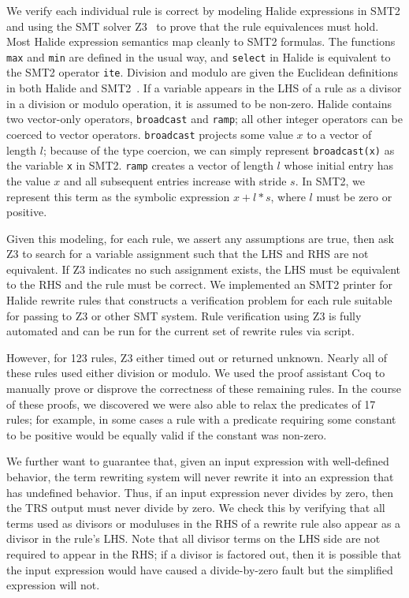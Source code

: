 \documentclass[sigplan,10pt,review,anonymous]{acmart}\settopmatter{printfolios=true,printccs=false,printacmref=false}
\newcommand{\NumPredicatesRelaxed}{{\color{black} 17}\xspace}
\begin{document}
We verify each individual rule is correct by modeling Halide expressions in SMT2
and using the SMT solver Z3~\cite{de2008z3} to prove that the rule equivalences must hold.
Most Halide expression semantics map cleanly
to SMT2 formulas. The functions \texttt{max} and \texttt{min} are defined in
the usual way, and \texttt{select} in Halide is equivalent to the SMT2 operator
\texttt{ite}. Division and modulo are given the Euclidean definitions in both
Halide and SMT2~\cite{boute1992euclidean}. If a variable appears in the LHS of a rule as a divisor in a
division or modulo operation, it is assumed to be non-zero. %
Halide contains two vector-only operators, \texttt{broadcast} and \texttt{ramp}; all
other integer operators can be coerced to vector operators. 
\texttt{broadcast} projects some value $x$ to a vector of length $l$; because of
the type coercion, we can simply represent \texttt{broadcast(x)} as the variable
\texttt{x} in SMT2. \texttt{ramp} creates a vector of length $l$
whose initial entry has the value $x$ and all subsequent entries increase with
stride $s$. In SMT2, we represent this term as the symbolic expression $x + l *
s$, where $l$ must be zero or positive.

Given this modeling, for each rule, we assert any assumptions are true, then
ask Z3 to search for a variable assignment such that the LHS and RHS are not
equivalent.  If Z3 indicates no such assignment exists, the LHS must be equivalent to
the RHS and the rule must be correct. We implemented an SMT2 printer for 
Halide rewrite rules that constructs a verification problem for each rule
suitable for passing to Z3 or other SMT system.  Rule verification using Z3 is fully automated
and can be run for the current set of rewrite rules via script.

However, for 123
rules, Z3 either timed out or returned unknown. Nearly all of these rules used
either division or modulo. We used the proof assistant Coq to manually prove or
disprove the correctness of these remaining rules. In the course of these proofs, we discovered we
were also able to relax the predicates of \NumPredicatesRelaxed rules; for example, in some cases a rule
with a predicate requiring some constant to be positive would be equally valid
if the constant was non-zero.

We further want to guarantee that, given an input expression with well-defined
behavior, the term rewriting system will never rewrite it into an expression that has
undefined behavior. Thus, if an input expression never divides by zero, then the
TRS output must never divide by zero. We check this by
verifying that all terms used as divisors or moduluses in the RHS of a
rewrite rule also appear as a divisor in the rule's LHS. Note that all divisor
terms on the LHS side are not required to appear in the RHS; if a divisor is
factored out, then it is possible that the input expression would have caused a
divide-by-zero fault but the simplified expression will not.
\end{document}
